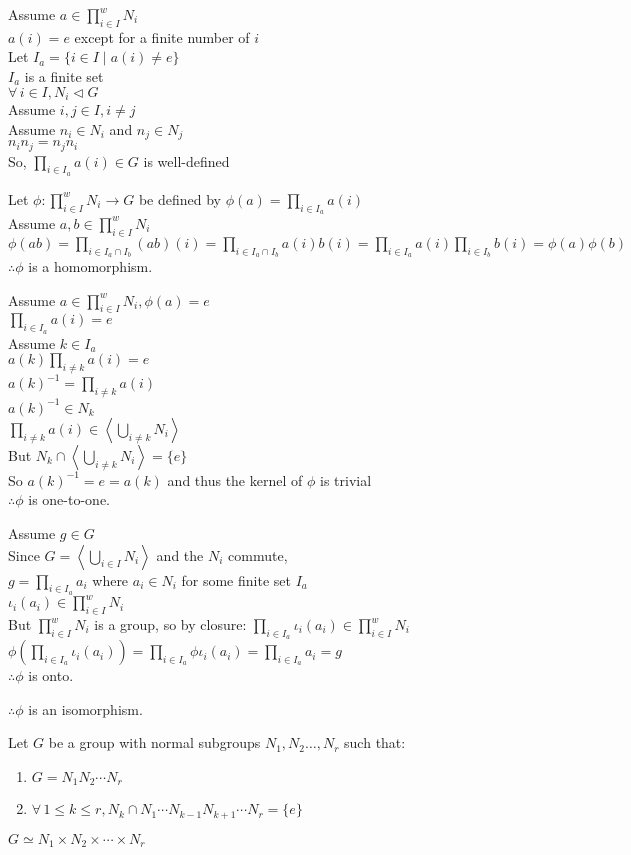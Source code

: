 \documentclass[letterpaper,12pt,fleqn]{article}
\newcommand{\n}{\triangleleft}
\newcommand{\cycle}[1]{\left<#1\right>}
\newcommand{\niweak}{\prod_{i\in I}^wN_i}
\newcommand{\p}{\phi}
\newcommand{\xprod}[1]{\prod_{i\in I_{#1}}#1(i)}
\renewcommand{\i}{\iota}
\begin{document}
\begin{theproof}
  Assume $a\in\niweak$ \\
  $a(i)=e$ except for a finite number of $i$ \\
  Let $I_a=\{i\in I\mid a(i)\ne e\}$ \\
  $I_a$ is a finite set \\
  $\forall\,i\in I,N_i\n G$ \\
  Assume $i,j\in I,i\ne j$ \\
  Assume $n_i\in N_i$ and $n_j\in N_j$ \\
  $n_in_j=n_jn_i$ \\
  So, $\xprod{a}\in G$ is well-defined

  Let $\p:\niweak\to G$ be defined by $\p(a)=\xprod{a}$ \\
  Assume $a,b\in\niweak$ \\
  $\p(ab)=\prod_{i\in I_a\cap I_b}(ab)(i)=\prod_{i\in I_a\cap I_b}a(i)b(i)=
  \xprod{a}\xprod{b}=\p(a)\p(b)$ \\
  $\therefore\p$ is a homomorphism.

  Assume $a\in\niweak,\p(a)=e$ \\
  $\xprod{a}=e$ \\
  Assume $k\in I_a$ \\
  $a(k)\prod_{i\ne k}a(i)=e$ \\
  $a(k)^{-1}=\prod_{i\ne k}a(i)$ \\
  $a(k)^{-1}\in N_k$ \\
  $\prod_{i\ne k}a(i)\in\cycle{\bigcup_{i\ne k}N_i}$ \\
  But $N_k\cap\cycle{\bigcup_{i\ne k}N_i}=\{e\}$ \\
  So $a(k)^{-1}=e=a(k)$ and thus the kernel of $\p$ is trivial \\
  $\therefore\p$ is one-to-one.

  Assume $g\in G$ \\
  Since $G=\cycle{\bigcup_{i\in I}N_i}$ and the $N_i$ commute, \\
  $g=\prod_{i\in I_a}a_i$ where $a_i\in N_i$ for some finite set $I_a$ \\
  $\i_i(a_i)\in\niweak$ \\
  But $\niweak$ is a group, so by closure:
  $\prod_{i\in I_a}{\i_i(a_i)}\in\niweak$ \\
  $\p\left(\prod_{i\in I_a}{\i_i(a_i)}\right)=\prod_{i\in I_a}\p\i_i(a_i)=
  \prod_{i\in I_a}a_i=g$ \\
  $\therefore\p$ is onto.

  $\therefore\p$ is an isomorphism.
\end{theproof}

\begin{corollary}
  Let $G$ be a group with normal subgroups $N_1,N_2\ldots,N_r$ such that:
  \begin{enumerate}
  \item $G=N_1N_2\cdots N_r$
  \item $\forall\,1\le k\le r,N_k\cap N_1\cdots N_{k-1}N_{k+1}\cdots N_r=
    \{e\}$
  \end{enumerate}
  $G\simeq N_1\times N_2\times\cdots\times N_r$
\end{corollary}
\end{document}
